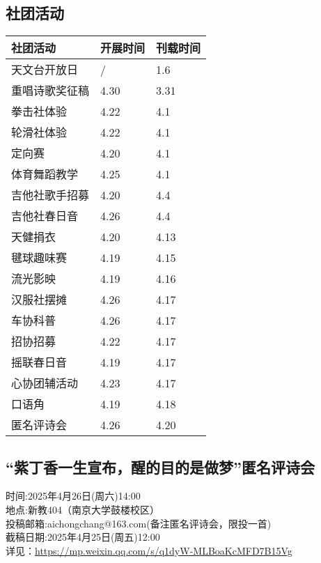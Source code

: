 \documentclass[letterpaper, 12pt]{article}
\begin{document}
\begin{multicols}{2}
\section{社团活动}
\begin{tabular}{|>{\centering\arraybackslash}m{}|m{}|m{}|}
    \hline
    社团活动 & 开展时间 & 刊载时间\\
    \hline\hline
    天文台开放日 & / & 1.6\\
    重唱诗歌奖征稿 & 4.30 & 3.31\\
    拳击社体验 & 4.22 & 4.1\\
    轮滑社体验 & 4.22 & 4.1\\
    定向赛 & 4.20 & 4.1\\
    体育舞蹈教学 & 4.25 & 4.1\\
    吉他社歌手招募 & 4.20 & 4.4\\
    吉他社春日音 & 4.26 & 4.4\\
    天健捐衣 & 4.20 & 4.13\\
    毽球趣味赛 & 4.19 & 4.15\\
    流光影映 & 4.19 & 4.16\\
    汉服社摆摊 & 4.26 & 4.17\\
    车协科普 & 4.26 & 4.17\\
    招协招募 & 4.22 & 4.17\\
    摇联春日音 & 4.19 & 4.17\\
    心协团辅活动 & 4.23 & 4.17\\
    口语角 & 4.19 & 4.18\\
    匿名评诗会 & 4.26 & 4.20\\
    \hline
\end{tabular}
\subsection{“紫丁香一生宣布，醒的目的是做梦”匿名评诗会} %
时间:2025年4月26日(周六)14:00
\\地点:新教404（南京大学鼓楼校区）
\\投稿邮箱:aichongchang@163.com(备注匿名评诗会，限投一首)
\\截稿日期:2025年4月25日(周五)12:00
\\详见：\url{https://mp.weixin.qq.com/s/q1dyW-MLBoaKcMFD7B15Vg}
\end{multicols}
\end{document}

